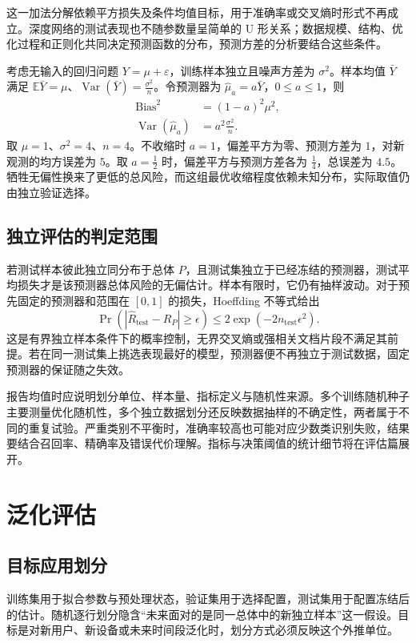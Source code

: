 \documentclass[../textbook.tex]{subfiles}
\begin{document}
这一加法分解依赖平方损失及条件均值目标，用于准确率或交叉熵时形式不再成立。深度网络的测试表现也不随参数量呈简单的 U 形关系；数据规模、结构、优化过程和正则化共同决定预测函数的分布，预测方差的分析要结合这些条件。

\begin{example}[收缩估计的偏差与方差]
考虑无输入的回归问题 $Y=\mu+\varepsilon$，训练样本独立且噪声方差为 $\sigma^2$。样本均值 $\bar Y$ 满足 $\mathbb E\bar Y=\mu$、$\operatorname{Var}(\bar Y)=\frac{\sigma^2}{n}$。令预测器为 $\widehat\mu_a=a\bar Y$，$0\leq a\leq1$，则
\begin{align*}
 \operatorname{Bias}^2 &= (1-a)^2\mu^2, \\
 \operatorname{Var}(\widehat\mu_a) &= a^2\frac{\sigma^2}{n}.
\end{align*}
取 $\mu=1$、$\sigma^2=4$、$n=4$。不收缩时 $a=1$，偏差平方为零、预测方差为 $1$，对新观测的均方误差为 $5$。取 $a=\frac{1}{2}$ 时，偏差平方与预测方差各为 $\frac{1}{4}$，总误差为 $4.5$。牺牲无偏性换来了更低的总风险，而这组最优收缩程度依赖未知分布，实际取值仍由独立验证选择。
\end{example}

\subsection{独立评估的判定范围}
若测试样本彼此独立同分布于总体 $P$，且测试集独立于已经冻结的预测器，测试平均损失才是该预测器总体风险的无偏估计。样本有限时，它仍有抽样波动。对于预先固定的预测器和范围在 $[0,1]$ 的损失，Hoeffding 不等式给出
\begin{equation}
 \Pr\!\left(|\widehat R_{\mathrm{test}}-R_P|\geq\epsilon\right)
 \leq2\exp(-2n_{\mathrm{test}}\epsilon^2).
\end{equation}
这是有界独立样本条件下的概率控制，无界交叉熵或强相关文档片段不满足其前提。若在同一测试集上挑选表现最好的模型，预测器便不再独立于测试数据，固定预测器的保证随之失效。

报告均值时应说明划分单位、样本量、指标定义与随机性来源。多个训练随机种子主要测量优化随机性，多个独立数据划分还反映数据抽样的不确定性，两者属于不同的重复试验。严重类别不平衡时，准确率较高也可能对应少数类识别失败，结果要结合召回率、精确率及错误代价理解。指标与决策阈值的统计细节将在评估篇展开。

\section{泛化评估}

\subsection{目标应用划分}
训练集用于拟合参数与预处理状态，验证集用于选择配置，测试集用于配置冻结后的估计。随机逐行划分隐含“未来面对的是同一总体中的新独立样本”这一假设。目标是对新用户、新设备或未来时间段泛化时，划分方式必须反映这个外推单位。
\end{document}
